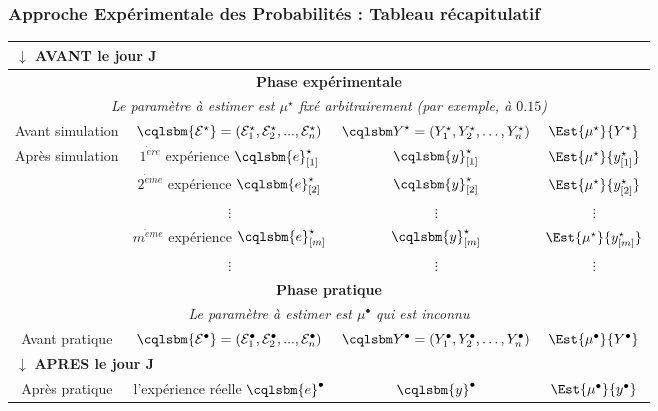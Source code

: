 \documentclass[11pt]{beamer}
\newcommand{\Sim}{{\star}}
\begin{document}
\begin{frame}[label=recap]
\frametitle{\textbf{A}pproche \textbf{E}xpérimentale des \textbf{P}robabilités : Tableau récapitulatif}
\begin{block}{}
{\tiny
\begin{center}
\begin{tabular}{|c|c|c|c|}\hline
\multicolumn{4}{|l|}{$\downarrow$ \textbf{AVANT le jour J}}\\\hline\hline
\multicolumn{4}{|c|}{\textbf{Phase expérimentale}}\\
\multicolumn{4}{|c|}{\textit{Le paramètre à estimer est $\mu^\Sim$ fixé arbitrairement (par exemple,  à $0.15$)}}\\\hline
Avant simulation & $\cqlsbm{\mathcal{E}^\Sim}=(\mathcal{E}^\Sim_1,\mathcal{E}^\Sim_2,...,\mathcal{E}^\Sim_n)$ & ${\cqlsbm Y}^\Sim=(Y^\Sim_1,Y^\Sim_2,\ldots,Y^\Sim_n)$ & $\Est{\mu^\Sim}{Y^\Sim}$ \pause\\\hline
Après simulation & $1^{\grave ere}$ expérience $\cqlsbm{e}^\Sim_{[1]}$ & $\cqlsbm{y}^\Sim_{[1]}$ & $\Est{\mu^\Sim}{y^\Sim_{[1]}}$\\
 & $2^{\grave eme}$ expérience $\cqlsbm{e}^\Sim_{[2]}$ & $\cqlsbm{y}^\Sim_{[2]}$ & $\Est{\mu^\Sim}{y^\Sim_{[2]}}$\\
 & $\vdots$ & $\vdots$ & $\vdots$ \\
 &$m^{\grave eme}$ expérience $\cqlsbm{e}^\Sim_{[m]}$ & $\cqlsbm{y}^\Sim_{[m]}$ & $\Est{\mu^\Sim}{y^\Sim_{[m]}}$ \\
 & $\vdots$ & $\vdots$ & $\vdots$ \pause\\ \hline\hline
\multicolumn{4}{|c|}{\textbf{Phase pratique}}\\
\multicolumn{4}{|c|}{\textit{Le paramètre à estimer est $\mu^\bullet$ qui est inconnu}}\\\hline
Avant pratique & $\cqlsbm{\mathcal{E}^\bullet}=(\mathcal{E}^\bullet_1,\mathcal{E}^\bullet_2,...,\mathcal{E}^\bullet_n)$ & ${\cqlsbm Y^\bullet}=(Y^\bullet_1,Y^\bullet_2,\ldots,Y^\bullet_n)$ & $\Est{\mu^\bullet}{Y^\bullet}$ \pause\\\hline\hline
\multicolumn{4}{|l|}{$\downarrow$ \textbf{APRES le jour J}}\\\hline\hline
Après pratique & l'expérience réelle $\cqlsbm{e}^\bullet$ & $\cqlsbm{y}^\bullet$ & $\Est{\mu^\bullet}{y^\bullet}$ \\\hline
\end{tabular}
\end{center}
}
\end{block}
\end{frame}
\end{document}
